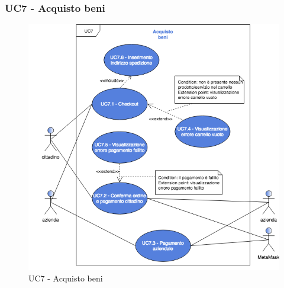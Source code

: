 \subsubsection{UC7 - Acquisto beni}
\begin{figure}[h]
	\includegraphics[width=14cm]{res/images/UC7-Generale.png}
	\centering
	\caption{UC7 - Acquisto beni}
\end{figure}
